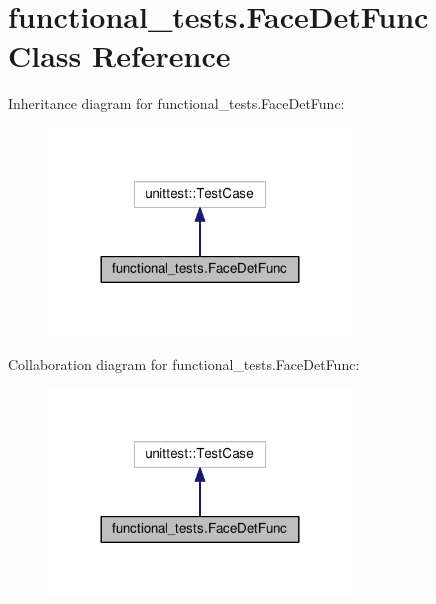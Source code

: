 \hypertarget{classfunctional__tests_1_1FaceDetFunc}{\section{functional\-\_\-tests.\-Face\-Det\-Func Class Reference}
\label{classfunctional__tests_1_1FaceDetFunc}
}


Inheritance diagram for functional\-\_\-tests.\-Face\-Det\-Func\-:
\nopagebreak
\begin{figure}[H]
\begin{center}
\leavevmode
\includegraphics[width=228pt]{classfunctional__tests_1_1FaceDetFunc__inherit__graph}
\end{center}
\end{figure}


Collaboration diagram for functional\-\_\-tests.\-Face\-Det\-Func\-:
\nopagebreak
\begin{figure}[H]
\begin{center}
\leavevmode
\includegraphics[width=228pt]{classfunctional__tests_1_1FaceDetFunc__coll__graph}
\end{center}
\end{figure}
